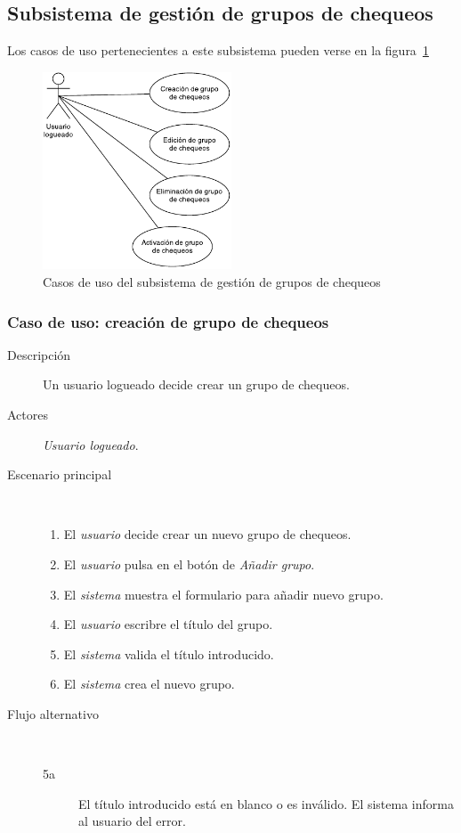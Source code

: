 \subsection{Subsistema de gestión de grupos de chequeos}

Los casos de uso pertenecientes a este subsistema pueden verse en la figura~\ref{fig:subsistema-grupos}

\begin{figure}[hp]
  \centering
  \includegraphics[width=0.5\textwidth]{4_analisis/diagrama_subsistema_gestion_grupos}
  \caption{Casos de uso del subsistema de gestión de grupos de chequeos}
  \label{fig:subsistema-grupos}
\end{figure}

\subsubsection{Caso de uso: creación de grupo de chequeos}

\begin{description}
\item[Descripción] Un usuario logueado decide crear un grupo de chequeos.
\item[Actores] \textit{Usuario logueado}.
\item[Escenario principal] $\quad$
  \begin{enumerate}
  \item El \textit{usuario} decide crear un nuevo grupo de chequeos.
  \item El \textit{usuario} pulsa en el botón de \textit{Añadir grupo}.
  \item El \textit{sistema} muestra el formulario para añadir nuevo grupo.
  \item El \textit{usuario} escribre el título del grupo.
  \item El \textit{sistema} valida el título introducido.
  \item El \textit{sistema} crea el nuevo grupo.
  \end{enumerate}
\item[Flujo alternativo] $\quad$

  \begin{description}
  \item[5a] El título introducido está en blanco o es inválido. El sistema
    informa al usuario del error.
  \end{description}
\end{description}


